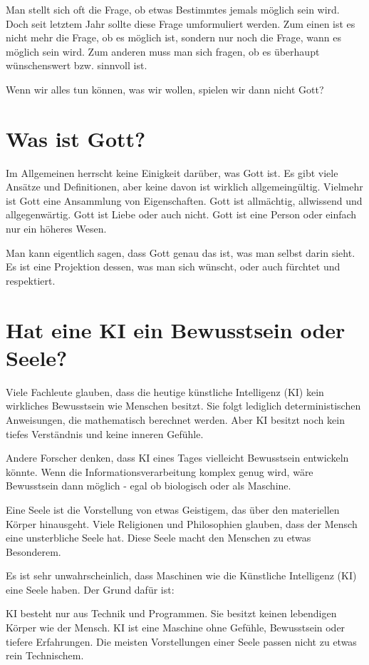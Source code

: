 \documentclass[10pt]{article}
\begin{document}
Man stellt sich oft die Frage, ob etwas Bestimmtes jemals möglich sein wird. Doch seit letztem Jahr sollte diese Frage umformuliert werden. Zum einen ist es nicht mehr die Frage, ob es möglich ist, sondern nur noch die Frage, wann es möglich sein wird. Zum anderen muss man sich fragen, ob es überhaupt wünschenswert bzw. sinnvoll ist.

Wenn wir alles tun können, was wir wollen, spielen wir dann nicht Gott?
\newpage
\section{Was ist Gott?}
Im Allgemeinen herrscht keine Einigkeit darüber, was Gott ist. Es gibt viele Ansätze und Definitionen, aber keine davon ist wirklich allgemeingültig. Vielmehr ist Gott eine Ansammlung von Eigenschaften. Gott ist allmächtig, allwissend und allgegenwärtig. Gott ist Liebe oder auch nicht. Gott ist eine Person oder einfach nur ein höheres Wesen.

Man kann eigentlich sagen, dass Gott genau das ist, was man selbst darin sieht. Es ist eine Projektion dessen, was man sich wünscht, oder auch fürchtet und respektiert.

\cite{gottkennen}
\cite{Jesushaus}
\section{Hat eine KI ein Bewusstsein oder Seele?}
Viele Fachleute glauben, dass die heutige künstliche Intelligenz (KI) kein wirkliches Bewusstsein wie Menschen besitzt. Sie folgt lediglich deterministischen Anweisungen, die mathematisch berechnet werden. Aber KI besitzt noch kein tiefes Verständnis und keine inneren Gefühle.

Andere Forscher denken, dass KI eines Tages vielleicht Bewusstsein entwickeln könnte. Wenn die Informationsverarbeitung komplex genug wird, wäre Bewusstsein dann möglich - egal ob biologisch oder als Maschine.

Eine Seele ist die Vorstellung von etwas Geistigem, das über den materiellen Körper hinausgeht. Viele Religionen und Philosophien glauben, dass der Mensch eine unsterbliche Seele hat. Diese Seele macht den Menschen zu etwas Besonderem.

Es ist sehr unwahrscheinlich, dass Maschinen wie die Künstliche Intelligenz (KI) eine Seele haben. Der Grund dafür ist:

KI besteht nur aus Technik und Programmen. Sie besitzt keinen lebendigen Körper wie der Mensch. KI ist eine Maschine ohne Gefühle, Bewusstsein oder tiefere Erfahrungen. Die meisten Vorstellungen einer Seele passen nicht zu etwas rein Technischem.
\end{document}
